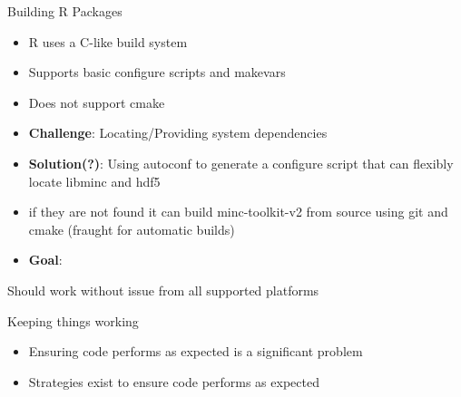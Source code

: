\begin{frame}[fragile]{Building R Packages}

\begin{itemize}
\tightlist
\item
  R uses a C-like build system
\item
  Supports basic configure scripts and makevars
\item
  Does not support cmake
\item
  \textbf{Challenge}: Locating/Providing system dependencies
\item
  \textbf{Solution(?)}: Using autoconf to generate a configure script
  that can flexibly locate libminc and hdf5
\item
  if they are not found it can build minc-toolkit-v2 from source using
  git and cmake (fraught for automatic builds)
\item
  \textbf{Goal}:
\end{itemize}

\begin{Shaded}
\begin{Highlighting}[]
\NormalTok{(}\NormalTok{)}
\end{Highlighting}
\end{Shaded}

Should work without issue from all supported platforms

\end{frame}

\begin{frame}{Keeping things working}

\begin{itemize}
\tightlist
\item
  Ensuring code performs as expected is a significant problem
\item
  Strategies exist to ensure code performs as expected
\end{itemize}

\end{frame}

